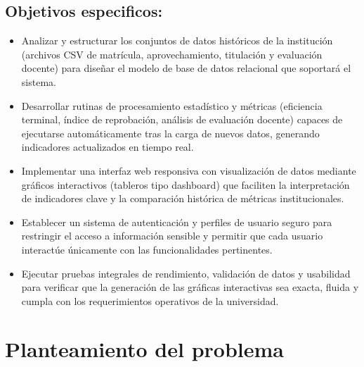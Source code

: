 \subsection{Objetivos especificos:}

\begin{itemize}
    \item Analizar y estructurar los conjuntos de datos históricos de la institución (archivos CSV de matrícula, aprovechamiento, titulación y evaluación docente) para diseñar el modelo de base de datos relacional que soportará el sistema.
\end{itemize}

 \begin{itemize}
     \item Desarrollar rutinas de procesamiento estadístico y métricas (eficiencia terminal, índice de reprobación, análisis de evaluación docente) capaces de ejecutarse automáticamente tras la carga de nuevos datos, generando indicadores actualizados en tiempo real.
 \end{itemize}

 \begin{itemize}
     \item Implementar una interfaz web responsiva con visualización de datos mediante gráficos interactivos (tableros tipo dashboard) que faciliten la interpretación de indicadores clave y la comparación histórica de métricas institucionales.
 \end{itemize}

 \begin{itemize}
     \item Establecer un sistema de autenticación y perfiles de usuario seguro para restringir el acceso a información sensible y permitir que cada usuario interactúe únicamente con las funcionalidades pertinentes.
 \end{itemize}

 \begin{itemize}
     \item Ejecutar pruebas integrales de rendimiento, validación de datos y usabilidad para verificar que la generación de las gráficas interactivas sea exacta, fluida y cumpla con los requerimientos operativos de la universidad.
 \end{itemize}

\newpage
\section{Planteamiento del problema}


